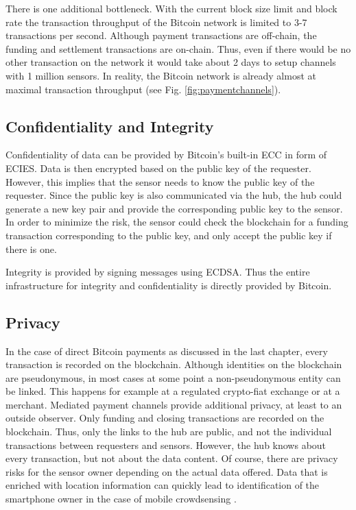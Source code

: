 There is one additional bottleneck. With the current block size limit and block rate the transaction throughput of the Bitcoin network is limited to 3-7 transactions per second. Although payment transactions are off-chain, the funding and settlement transactions are on-chain. Thus, even if there would be no other transaction on the network it would take about 2 days to setup channels with 1 million sensors. In reality, the Bitcoin network is already almost at maximal transaction throughput (see Fig. \ref{fig:paymentchannels}).

\subsection{Confidentiality and Integrity}

Confidentiality of data can be provided by Bitcoin's built-in \ac{ECC} in form of \ac{ECIES}. Data is then encrypted based on the public key of the requester. However, this implies that the sensor needs to know the public key of the requester. Since the public key is also communicated via the hub, the hub could generate a new key pair and provide the corresponding public key to the sensor. In order to minimize the risk, the sensor could check the blockchain for a funding transaction corresponding to the public key, and only accept the public key if there is one.

Integrity is provided by signing messages using \ac{ECDSA}. Thus the entire infrastructure for integrity and confidentiality is directly provided by Bitcoin.

\subsection{Privacy}  

In the case of direct Bitcoin payments as discussed in the last chapter, every transaction is recorded on the blockchain. Although identities on the blockchain are pseudonymous, in most cases at some point a non-pseudonymous entity can be linked. This happens for example at a regulated crypto-fiat exchange or at a merchant. 
Mediated payment channels provide additional privacy, at least to an outside observer. Only funding and closing transactions are recorded on the blockchain. Thus, only the links to the hub are public, and not the individual transactions between requesters and sensors. However, the hub knows about every transaction, but not about the data content. Of course, there are privacy risks for the sensor owner depending on the actual data offered. Data that is enriched with location information can quickly lead to identification of the smartphone owner in the case of mobile crowdsensing \parencite{de2013unique}. 

